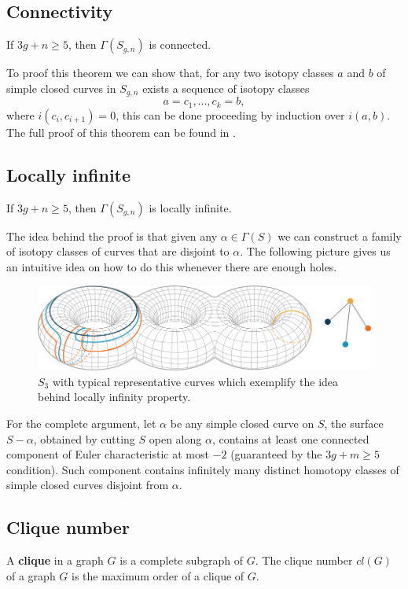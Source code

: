 \subsection{Connectivity}
\begin{theorem}
If $3g+n\geq 5$, then $\Gamma(S_{g,n})$ is connected.
\end{theorem}

To proof this theorem we can show that, for any two isotopy classes $a$ and $b$ of simple closed curves in $S_{g,n}$ exists a sequence of isotopy classes
$$a=c_{1},\dots,c_{k}=b,$$
where $i(c_{i},c_{i+1})=0$, this can be done proceeding by induction over $i(a,b)$. The full proof of this theorem can be found in \cite[Farb, p.~93]{Farb}.

\subsection{Locally infinite}
\begin{theorem}
If $3g+n\geq 5$, then $\Gamma(S_{g,n})$ is locally infinite.
\end{theorem}
The idea behind the proof is that given any $\alpha \in \Gamma(S)$ we can construct a family of isotopy classes of curves that are disjoint to $\alpha$. The following picture gives us an intuitive idea on how to do this whenever there are enough holes.
\vspace{0.5cm}
\begin{figure}[h!]
	\centering
	\includegraphics[scale=0.6]{Figures/Locally-infinite.png}
	\caption{$S_{3}$ with typical representative curves which exemplify the idea behind locally infinity property.}
\end{figure}

For the complete argument, let $\alpha$ be any simple closed curve on $S$, the surface $S-\alpha$, obtained by cutting $S$ open along $\alpha$, contains at least one connected component of Euler characteristic at most $-2$ (guaranteed by the $3g+m\geq 5$ condition). Such component contains infinitely many distinct homotopy classes of simple closed curves disjoint from $\alpha$.

\subsection{Clique number}
A \textbf{clique} in a graph $G$ is a complete subgraph of $G$. The clique number $cl(G)$ of a graph $G$ is the maximum order of a clique of $G$.

